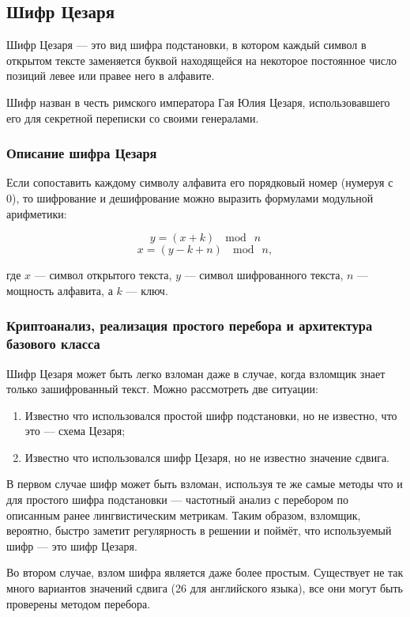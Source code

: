 \subsection{Шифр Цезаря}

Шифр Цезаря — это вид шифра подстановки, в котором каждый символ 
в открытом тексте заменяется буквой находящейся на некоторое 
постоянное число позиций левее или правее него в алфавите.

Шифр назван в честь римского императора Гая Юлия Цезаря, использовавшего 
его для секретной переписки со своими генералами.

\subsubsection{Описание шифра Цезаря}

Если сопоставить каждому символу алфавита его порядковый номер 
(нумеруя с 0), то шифрование и дешифрование можно выразить формулами 
модульной арифметики:

    $$y=(x+k)\ \mod\ n$$
    $$x=(y-k+n)\ \mod\ n,$$

где $x$ — символ открытого текста, $y$ — символ шифрованного 
текста, $n$ — мощность алфавита, а $k$ — ключ.

\subsubsection{Криптоанализ, реализация простого перебора и архитектура базового класса}

Шифр Цезаря может быть легко взломан даже в случае, когда взломщик 
знает только зашифрованный текст. Можно рассмотреть две ситуации:

\begin{enumerate}
\item Известно что использовался простой шифр подстановки, но 
    не известно, что это — схема Цезаря;
\item Известно что использовался шифр Цезаря, но не известно 
   значение сдвига.
\end{enumerate}

В первом случае шифр может быть взломан, используя те же самые 
методы что и для простого шифра подстановки — частотный 
анализ с перебором по описанным ранее лингвистическим метрикам.
Таким образом, взломщик, вероятно, быстро 
заметит регулярность в решении и поймёт, что используемый шифр — 
это шифр Цезаря.

Во втором случае, взлом шифра является даже более простым. Существует 
не так много вариантов значений сдвига (26 для английского языка), 
все они могут быть проверены методом перебора.

